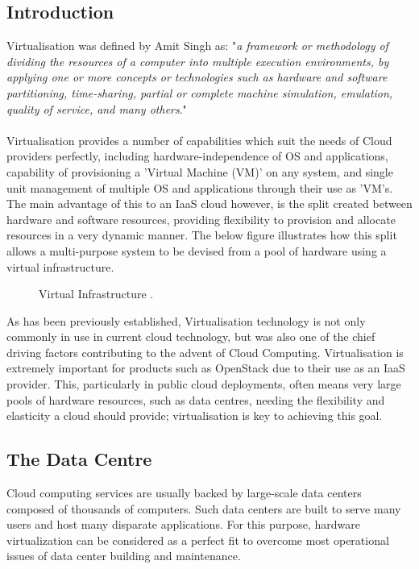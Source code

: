 \subsection{Introduction}
Virtualisation was defined by Amit Singh \cite{virtintro} as: "\textit{a framework or methodology of dividing the resources of a computer into multiple execution environments, by applying one or more concepts
or technologies such as hardware and software partitioning, time-sharing, partial or complete machine simulation, emulation, quality of service, and many others}." \\ \\
Virtualisation provides a number of capabilities which suit the needs of Cloud providers perfectly, including hardware-independence of OS and applications, capability of provisioning a 'Virtual Machine (VM)' on any system, and single unit management of multiple OS and applications through their use as 'VM's\cite{vmwareoverview}.  \\
The main advantage of this to an IaaS cloud however, is the split created between hardware and software resources, providing flexibility to provision and allocate resources in a very dynamic manner. The below figure illustrates how this split allows a multi-purpose system to be devised from a pool of hardware using a virtual infrastructure. 

\begin{figure}[ht]
\centering
{}
\caption{Virtual Infrastructure \cite{vmwareoverview}.}
\end{figure}

As has been previously established, Virtualisation technology is not only commonly in use in current cloud technology, but was also one of the chief driving factors contributing to the advent of Cloud Computing. Virtualisation is extremely important for products such as OpenStack due to their use as an IaaS provider. This, particularly in public cloud deployments, often means very large pools of hardware resources, such as data centres, needing the flexibility and elasticity a cloud should provide; virtualisation is key to achieving this goal. 


\subsection{The Data Centre}
Cloud computing services are usually backed by large-scale data centers composed of thousands of computers. Such data centers are built to serve many users and host many disparate applications. For this purpose, hardware
virtualization can be considered as a perfect fit to overcome most operational
issues of data center building and maintenance\cite{principlesparadigms}. 

